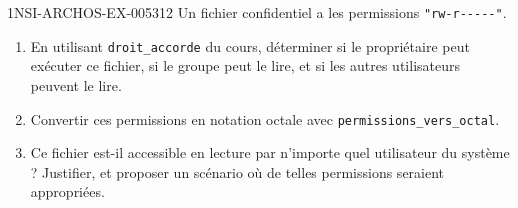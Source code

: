 \begin{exercice}{1NSI-ARCHOS-EX-005}{3}{12}
Un fichier confidentiel a les permissions \lstinline{"rw-r-----"}.
\begin{enumerate}
  \item En utilisant \lstinline{droit_accorde} du cours, déterminer si le propriétaire peut exécuter ce fichier, si le groupe peut le lire, et si les autres utilisateurs peuvent le lire.
  \item Convertir ces permissions en notation octale avec \lstinline{permissions_vers_octal}.
  \item Ce fichier est-il accessible en lecture par n'importe quel utilisateur du système ? Justifier, et proposer un scénario où de telles permissions seraient appropriées.
\end{enumerate}
\end{exercice}
